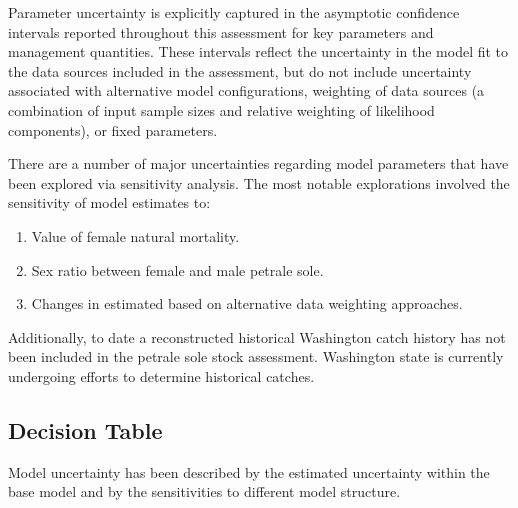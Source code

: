 \documentclass[12pt,]{article}
\begin{document}
Parameter uncertainty is explicitly captured in the asymptotic
confidence intervals reported throughout this assessment for key
parameters and management quantities. These intervals reflect the
uncertainty in the model fit to the data sources included in the
assessment, but do not include uncertainty associated with alternative
model configurations, weighting of data sources (a combination of input
sample sizes and relative weighting of likelihood components), or fixed
parameters.

There are a number of major uncertainties regarding model parameters
that have been explored via sensitivity analysis. The most notable
explorations involved the sensitivity of model estimates to:

\begin{enumerate}

\item Value of female natural mortality.

\item Sex ratio between female and male petrale sole.

\item Changes in estimated based on alternative data weighting approaches.

\end{enumerate}

Additionally, to date a reconstructed historical Washington catch
history has not been included in the petrale sole stock assessment.
Washington state is currently undergoing efforts to determine historical
catches.

\subsection*{Decision Table}\label{decision-table}

Model uncertainty has been described by the estimated uncertainty within
the base model and by the sensitivities to different model structure.
\end{document}
